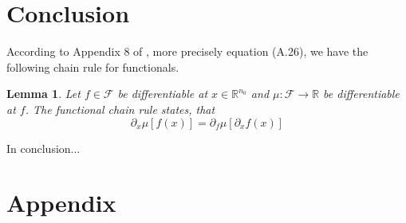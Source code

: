 \documentclass[11pt, a4paper]{article}
\newtheorem{lemma}[theorem]{Lemma}
\newcommand{\R}{\mathbb{R}}
\newcommand{\F}{\mathcal{F}}
\begin{document}
\section{Conclusion}

According to Appendix 8 of \cite{Functionals}, more precisely equation (A.26), we have the following chain rule for functionals.

\begin{lemma}
Let $f \in \F$ be differentiable at $x \in \R^{n_0}$ and $\mu : \F \to \R$ be differentiable at $f$. The functional chain rule states, that
\[ \partial_x \mu[f(x)] = \partial_f \mu[\partial_xf(x)] \]
\end{lemma}

In conclusion...
\pagebreak
\appendix

\section{Appendix}
\end{document}
